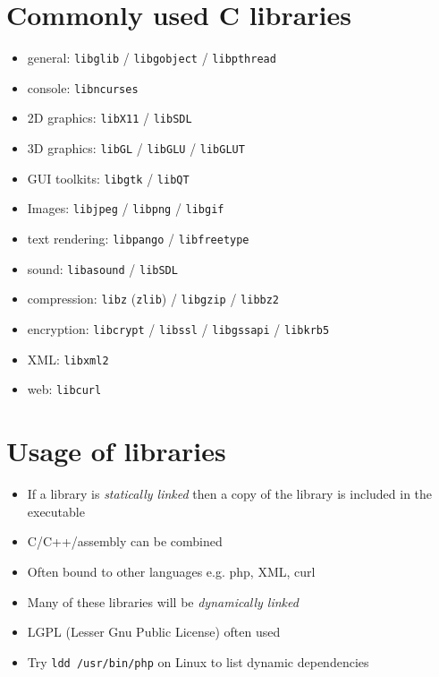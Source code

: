 \documentclass{article}
\begin{document}
\section{Commonly used C libraries}
\begin{itemize}
\item general: \verb!libglib! / \verb!libgobject! / \verb!libpthread!
\item console: \verb!libncurses!
\item 2D graphics: \verb!libX11! / \verb!libSDL!
\item 3D graphics: \verb!libGL! / \verb!libGLU! / \verb!libGLUT!
\item GUI toolkits: \verb!libgtk! / \verb!libQT!
\item Images: \verb!libjpeg! / \verb!libpng! / \verb!libgif!
\item text rendering: \verb!libpango! / \verb!libfreetype!
\item sound: \verb!libasound! / \verb!libSDL!
\item compression: \verb!libz! (\verb!zlib!) / \verb!libgzip! / \verb!libbz2!
\item encryption: \verb!libcrypt! / \verb!libssl! / \verb!libgssapi! / \verb!libkrb5!
\item XML: \verb!libxml2!
\item web: \verb!libcurl!
\end{itemize}



\section{Usage of libraries}
\begin{itemize}
\item If a library is \emph{statically linked} then a copy of the library is included in the executable
\item C/C++/assembly can be combined
\item Often bound to other languages e.g. php, XML, curl
\item Many of these libraries will be \emph{dynamically linked}
\item LGPL (Lesser Gnu Public License) often used
\item Try \verb!ldd /usr/bin/php! on Linux to list dynamic dependencies
\end{itemize}
\end{document}

